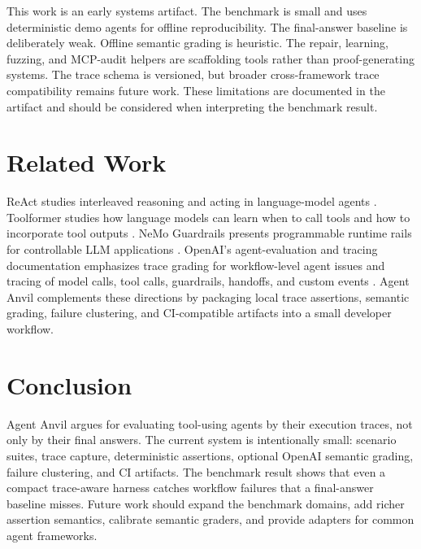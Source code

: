 \documentclass[11pt]{article}
\begin{document}
This work is an early systems artifact. The benchmark is small and uses
deterministic demo agents for offline reproducibility. The final-answer baseline
is deliberately weak. Offline semantic grading is heuristic. The repair,
learning, fuzzing, and MCP-audit helpers are scaffolding tools rather than
proof-generating systems. The trace schema is versioned, but broader
cross-framework trace compatibility remains future work. These limitations are
documented in the artifact and should be considered when interpreting the
benchmark result.

\section{Related Work}

ReAct studies interleaved reasoning and acting in language-model agents
\cite{yao2023react}. Toolformer studies how language models can learn when to
call tools and how to incorporate tool outputs \cite{schick2023toolformer}.
NeMo Guardrails presents programmable runtime rails for controllable LLM
applications \cite{rebedea2023nemo}. OpenAI's agent-evaluation and tracing
documentation emphasizes trace grading for workflow-level agent issues and
tracing of model calls, tool calls, guardrails, handoffs, and custom events
\cite{openaiAgentEvals,openaiAgentsTracing}. Agent Anvil complements these
directions by packaging local trace assertions, semantic grading, failure
clustering, and CI-compatible artifacts into a small developer workflow.

\section{Conclusion}

Agent Anvil argues for evaluating tool-using agents by their execution traces,
not only by their final answers. The current system is intentionally small:
scenario suites, trace capture, deterministic assertions, optional OpenAI
semantic grading, failure clustering, and CI artifacts. The benchmark result
shows that even a compact trace-aware harness catches workflow failures that a
final-answer baseline misses. Future work should expand the benchmark domains,
add richer assertion semantics, calibrate semantic graders, and provide
adapters for common agent frameworks.



\end{document}

